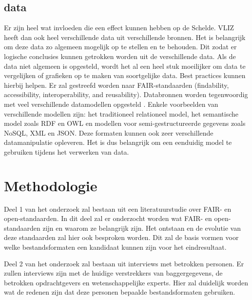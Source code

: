 \subsection{data}
Er zijn heel wat invloeden die een effect kunnen hebben op de Schelde. VLIZ heeft dan ook heel verschillende data uit verschillende bronnen. Het is belangrijk om deze data zo algemeen mogelijk op te stellen en te behouden. Dit zodat er logische conclusies kunnen getrokken worden uit de verschillende data. Als de data niet algemeen is opgesteld, wordt het al een heel stuk moeilijker om data te vergelijken of grafieken op te maken van soortgelijke data. Best practices kunnen hierbij helpen. Er zal gestreefd worden naar FAIR-standaarden (findability, accessibility, interoperability, and reusability). Databronnen worden tegenwoordig met veel verschillende datamodellen opgesteld \autocite{Stupnikov2018}. Enkele voorbeelden van verschillende modellen zijn: het traditioneel relationeel model, het semantische model zoals RDF en OWL en modellen voor
semi-gestructureerde gegevens zoals NoSQL, XML en JSON. Deze formaten kunnen ook zeer verschillende datamanipulatie opleveren. Het is dus belangrijk om een eenduidig model te gebruiken tijdens het verwerken van data.


\section{Methodologie}%
\label{sec:methodologie}

Deel 1 van het onderzoek zal bestaan uit een literatuurstudie over FAIR- en open-standaarden. In dit deel zal er onderzocht worden wat FAIR- en open-standaarden zijn en waarom ze belangrijk zijn. Het ontstaan en de evolutie van deze standaarden zal hier ook besproken worden. Dit zal de basis vormen voor welke bestandsformaten een kandidaat kunnen zijn voor het eindresultaat.

Deel 2 van het onderzoek zal bestaan uit interviews met betrokken personen. Er zullen interviews zijn met de huidige verstrekkers van baggergegevens, de betrokken opdrachtgevers en wetenschappelijke experts. Hier zal duidelijk worden wat de redenen zijn dat deze personen bepaalde bestandsformaten gebruiken.

